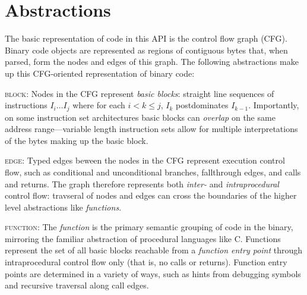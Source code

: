 \documentclass{article}
\begin{document}
\section{Abstractions}
\label{sec:abstractions}

The basic representation of code in this API is the control flow
graph (CFG). Binary code objects are represented as regions of contiguous bytes that, when parsed, form the nodes and edges of this graph. The following abstractions make up this CFG-oriented representation of binary code:

%
\begin{itemize}[leftmargin=0pt,label=$\circ$]


{\item {\scshape block}: Nodes in the CFG represent \emph{basic blocks}:
straight line sequences of instructions $I_i \ldots I_j$ where for each $i < k
\le j$, $I_k$ postdominates $I_{k-1}$. Importantly, on some instruction set architectures basic blocks can \emph{overlap} on the same address range---variable length instruction sets allow for multiple interpretations of the bytes making up the basic block.
}

{\item {\scshape edge}: Typed edges beween the nodes in the CFG represent
execution control flow, such as conditional and unconditional branches,
fallthrough edges, and calls and returns. The graph therefore represents both
\emph{inter-} and \emph{intraprocedural} control flow: travseral of nodes and
edges can cross the boundaries of the higher level abstractions like
\emph{functions}.
}

{\item {\scshape function}: The \emph{function} is the primary semantic grouping of code in the binary, mirroring the familiar abstraction of procedural languages like C. Functions represent the set of all basic blocks reachable from a \emph{function entry point} through intraprocedural control flow only (that is, no calls or returns). Function entry points are determined in a variety of ways, such as hints from debugging symbols and recursive traversal along call edges.
}

\end{itemize}
\end{document}
